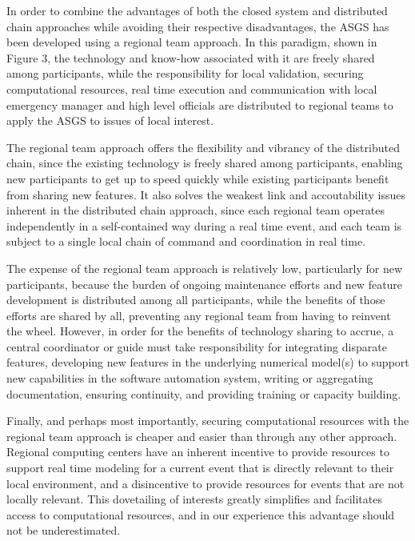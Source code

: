 \documentclass[12pt]{article}
\begin{document}
In order to combine the advantages of both the closed system and 
distributed chain approaches while avoiding their respective 
disadvantages, the ASGS has been developed using a regional team 
approach. In this paradigm, shown in Figure 3, the technology and 
know-how associated with it are freely shared among participants, 
while the responsibility for local validation, securing computational 
resources, real time execution and communication with local emergency
manager and high level officials are distributed to regional teams 
to apply the ASGS to issues of local interest. 

The regional team approach offers the flexibility and vibrancy of 
the distributed chain, since the existing technology is freely 
shared among participants, enabling new participants to get up to 
speed quickly while existing participants benefit from sharing  new 
features. It also solves the weakest link and accoutability issues 
inherent in the distributed chain approach, since each regional team 
operates independently in a self-contained way during a real time 
event, and each team is subject to a single local chain of command and 
coordination in real time.

The expense of the regional team approach is relatively low, 
particularly for new participants, because the burden of ongoing 
maintenance efforts and new feature development is distributed among 
all participants, while the benefits of those efforts are shared by 
all, preventing any regional team from having to reinvent the wheel. 
However, in order for the benefits of technology sharing to accrue, 
a central coordinator or guide must take responsibility for 
integrating disparate features, developing new features in the 
underlying numerical model(s) to support new capabilities in the 
software automation system, writing or aggregating documentation, 
ensuring continuity, and providing training or capacity building. 

Finally, and perhaps most importantly, securing computational 
resources with the regional team approach is cheaper and easier than 
through any other approach. Regional computing centers have an 
inherent incentive to provide resources to support real time 
modeling for a current event that is directly relevant to their 
local environment, and a disincentive to provide resources for 
events that are not locally relevant. This dovetailing of interests 
greatly simplifies and facilitates access to computational 
resources, and in our experience this advantage should not be 
underestimated. 
\end{document}
